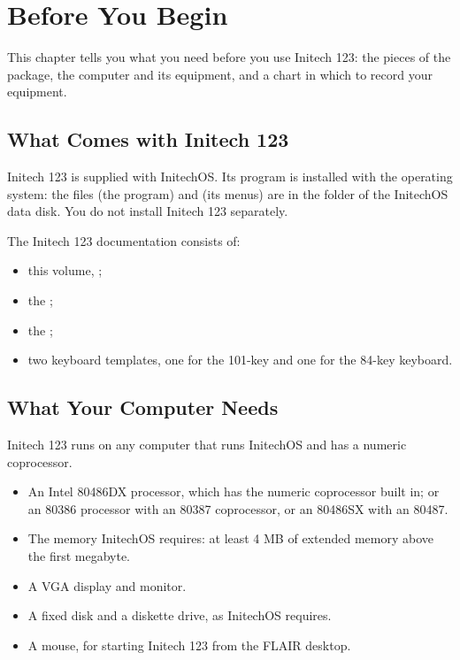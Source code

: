 \chapter{Before You Begin}

This chapter tells you what you need before you use Initech 123: the pieces
of the package, the computer and its equipment, and a chart in which to
record your equipment.

\section{What Comes with Initech 123}
Initech 123 is supplied with InitechOS.  Its program is installed with the
operating system: the files  (the program) and 
(its menus) are in the folder  of the InitechOS data disk.  You do
not install Initech 123 separately.

The Initech 123 documentation consists of:
\begin{itemize}
\item this volume, ;
\item the ;
\item the ;
\item two keyboard templates, one for the 101-key and one for the 84-key
  keyboard.
\end{itemize}

\section{What Your Computer Needs}
Initech 123 runs on any computer that runs InitechOS and has a numeric
coprocessor.
\begin{itemize}
\item An Intel 80486DX processor, which has the numeric coprocessor built
  in; or an 80386 processor with an 80387 coprocessor, or an 80486SX with an
  80487.
\item The memory InitechOS requires: at least 4 MB of extended memory above
  the first megabyte.
\item A VGA display and monitor.
\item A fixed disk and a diskette drive, as InitechOS requires.
\item A mouse, for starting Initech 123 from the FLAIR desktop.
\end{itemize}

